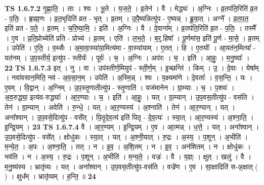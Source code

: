 \documentclass[17pt]{extarticle}
\begin{document}
                  \newline
                                \textbf{ TS 1.6.7.2} \newline
                  गृ॒ह्णा॒ति॒ । ताः । श्वः । भू॒ते । य॒ज॒ते॒ । व्र॒तेन॑ । वै । मेद्ध्यः॑ । अ॒ग्निः । व्र॒तप॑ति॒रिति॑ व्र॒त - प॒तिः॒ । ब्रा॒ह्म॒णः । व्र॒त॒भृदिति॑ व्रत - भृत् । व्र॒तम् । उ॒पै॒ष्यन्नित्यु॑प - ए॒ष्यन्न् । ब्रू॒या॒त् । अग्ने᳚ । व्र॒त॒प॒त॒ इति॑ व्रत - प॒ते॒ । व्र॒तम् । च॒रि॒ष्या॒मि॒ । इति॑ । अ॒ग्निः । वै । दे॒वाना᳚म् । व्र॒तप॑ति॒रिति॑ व्र॒त - प॒तिः॒ । तस्मै᳚ । ए॒व । प्र॒ति॒प्रोच्येति॑ प्रति - प्रोच्य॑ । व्र॒तम् । एति॑ । ल॒भ॒ते॒ । ब॒र्॒.हिषा᳚ । पू॒र्णमा॑स॒ इति॑ पू॒र्ण - मा॒से॒ । व्र॒तम् । उपेति॑ । ए॒ति॒ । व॒थ्सैः । अ॒मा॒वा॒स्या॑या॒मित्य॑मा - वा॒स्या॑याम् । ए॒तत् । हि । ए॒तयोः᳚ । आ॒यत॑न॒मित्या᳚ - यत॑नम् । उ॒प॒स्तीर्य॒ इत्यु॑प - स्तीर्यः॑ । पूर्वः॑ । च॒ । अ॒ग्निः । अप॑रः । च॒ । इति॑ । आ॒हुः॒ । म॒नु॒ष्याः᳚ । \textbf{  22} \newline
                  \newline
                                \textbf{ TS 1.6.7.3} \newline
                  इत् । नु । वा । उप॑स्तीर्ण॒मियुप॑ - स्ती॒र्ण॒म् । इ॒च्छन्ति॑ । किम् । उ॒ । दे॒वाः । येषा᳚म् । नवा॑वसान॒मिति॒ नव॑ - अ॒व॒सा॒न॒म् । उपेति॑ । अ॒स्मि॒न्न् । श्वः । य॒क्ष्यमा॑णे । दे॒वताः᳚ । व॒स॒न्ति॒ । यः । ए॒वम् । वि॒द्वान् । अ॒ग्निम् । उ॒प॒स्तृ॒णातीत्यु॑प - स्तृ॒णाति॑ । यज॑मानेन । ग्रा॒म्याः । च॒ । प॒शवः॑ । अ॒व॒रुद्ध्या॒ इत्य॑व-रुद्ध्याः᳚ । आ॒र॒ण्याः । च॒ । इति॑ । आ॒हुः॒ । यत् । ग्रा॒म्यान् । उ॒प॒वस॒तीत्यु॑प - वस॑ति । तेन॑ । ग्रा॒म्यान् । अवेति॑ । रु॒न्धे॒ । यत् । आ॒र॒ण्यस्य॑ । अ॒श्नाति॑ । तेन॑ । आ॒र॒ण्यान् । यत् । अना᳚श्वान् । उ॒प॒वसे॒दित्यु॑प - वसे᳚त् । पि॒तृ॒दे॒व॒त्य॑ इति॑ पितृ - दे॒व॒त्यः॑ । स्या॒त् । आ॒र॒ण्यस्य॑ । अ॒श्ना॒ति॒ । इ॒न्द्रि॒यम् । \textbf{  23} \newline
                  \newline
                                \textbf{ TS 1.6.7.4} \newline
                  वै । आ॒र॒ण्यम् । इ॒न्द्रि॒यम् । ए॒व । आ॒त्मन्न् । ध॒त्ते॒ । यत् । अना᳚श्वान् । उ॒प॒वसे॒दित्यु॑प - वसे᳚त् । क्षोधु॑कः । स्या॒त् । यत् । अ॒श्नी॒यात् । रु॒द्रः । अ॒स्य॒ । प॒शून् । अ॒भीति॑ । म॒न्ये॒त॒ । अ॒पः । अ॒श्ना॒ति॒ । तत् । न । इ॒व॒ । अ॒शि॒तम् । न । इ॒व॒ । अन॑शितम् । न । क्षोधु॑कः । भव॑ति । न । अ॒स्य॒ । रु॒द्रः । प॒शून् । अ॒भीति॑ । म॒न्य॒ते॒ । वज्रः॑ । वै । य॒ज्ञ्ः । क्षुत् । खलु॑ । वै । म॒नु॒ष्य॑स्य । भ्रातृ॑व्यः । यत् । अना᳚श्वान् । उ॒प॒वस॒तीत्यु॑प-वस॑ति । वज्रे॑ण । ए॒व । सा॒क्षादिति॑ स-अ॒क्षात् ( ) । क्षुध᳚म् । भ्रातृ॑व्यम् । ह॒न्ति॒ ॥ \textbf{  24} \newline
\end{document}
